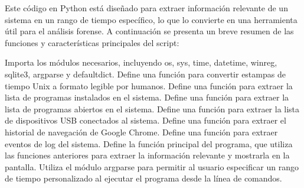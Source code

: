Este código en Python está diseñado para extraer información relevante de un sistema en un rango de tiempo específico, lo que lo convierte en una herramienta útil para el análisis forense. A continuación se presenta un breve resumen de las funciones y características principales del script:

Importa los módulos necesarios, incluyendo os, sys, time, datetime, winreg, sqlite3, argparse y defaultdict.
Define una función para convertir estampas de tiempo Unix a formato legible por humanos.
Define una función para extraer la lista de programas instalados en el sistema.
Define una función para extraer la lista de programas abiertos en el sistema.
Define una función para extraer la lista de dispositivos USB conectados al sistema.
Define una función para extraer el historial de navegación de Google Chrome.
Define una función para extraer eventos de log del sistema.
Define la función principal del programa, que utiliza las funciones anteriores para extraer la información relevante y mostrarla en la pantalla.
Utiliza el módulo argparse para permitir al usuario especificar un rango de tiempo personalizado al ejecutar el programa desde la línea de comandos.